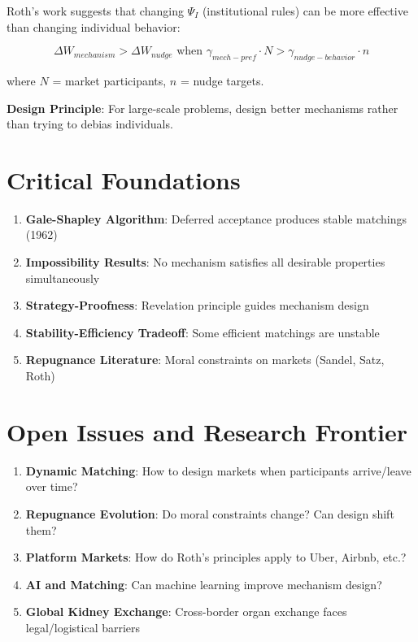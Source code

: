 Roth's work suggests that changing $\Psi_I$ (institutional rules) can be more effective than changing individual behavior:

\begin{equation}
\Delta W_{mechanism} > \Delta W_{nudge} \text{ when } \gamma_{mech-pref} \cdot N > \gamma_{nudge-behavior} \cdot n
\end{equation}

where $N$ = market participants, $n$ = nudge targets.

\textbf{Design Principle}: For large-scale problems, design better mechanisms rather than trying to debias individuals.

\section{Critical Foundations}

\begin{tcolorbox}[colback=orange!5!white,colframe=orange!75!black,title=Critical Foundations]
\begin{enumerate}
    \item \textbf{Gale-Shapley Algorithm}: Deferred acceptance produces stable matchings (1962)
    \item \textbf{Impossibility Results}: No mechanism satisfies all desirable properties simultaneously
    \item \textbf{Strategy-Proofness}: Revelation principle guides mechanism design
    \item \textbf{Stability-Efficiency Tradeoff}: Some efficient matchings are unstable
    \item \textbf{Repugnance Literature}: Moral constraints on markets (Sandel, Satz, Roth)
\end{enumerate}
\end{tcolorbox}

\section{Open Issues and Research Frontier}

\begin{enumerate}
    \item \textbf{Dynamic Matching}: How to design markets when participants arrive/leave over time?
    \item \textbf{Repugnance Evolution}: Do moral constraints change? Can design shift them?
    \item \textbf{Platform Markets}: How do Roth's principles apply to Uber, Airbnb, etc.?
    \item \textbf{AI and Matching}: Can machine learning improve mechanism design?
    \item \textbf{Global Kidney Exchange}: Cross-border organ exchange faces legal/logistical barriers
\end{enumerate}

